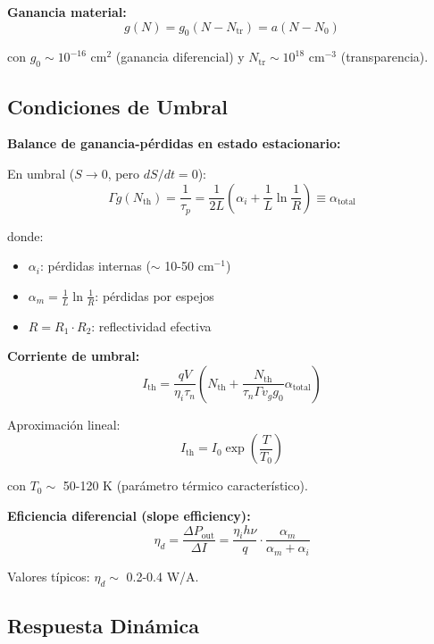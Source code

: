 \documentclass[11pt,a4paper]{article}
\begin{document}
\textbf{Ganancia material:}
\begin{equation}
    g(N) = g_0(N - N_{\text{tr}}) = a(N - N_0)
\end{equation}

con $g_0 \sim 10^{-16}$ cm$^2$ (ganancia diferencial) y $N_{\text{tr}} \sim 10^{18}$ cm$^{-3}$ (transparencia).

\subsection{Condiciones de Umbral}

\textbf{Balance de ganancia-pérdidas en estado estacionario:}

En umbral ($S \to 0$, pero $dS/dt = 0$):
\begin{equation}
    \Gamma g(N_{\text{th}}) = \frac{1}{\tau_p} = \frac{1}{2L}\left(\alpha_i + \frac{1}{L}\ln\frac{1}{R}\right) \equiv \alpha_{\text{total}}
\end{equation}

donde:
\begin{itemize}
    \item $\alpha_i$: pérdidas internas ($\sim$ 10-50 cm$^{-1}$)
    \item $\alpha_m = \frac{1}{L}\ln\frac{1}{R}$: pérdidas por espejos
    \item $R = R_1 \cdot R_2$: reflectividad efectiva
\end{itemize}

\textbf{Corriente de umbral:}
\begin{equation}
    I_{\text{th}} = \frac{qV}{\eta_i\tau_n}\left(N_{\text{th}} + \frac{N_{\text{th}}}{\tau_n \Gamma v_g g_0}\alpha_{\text{total}}\right)
\end{equation}

Aproximación lineal:
\begin{equation}
    I_{\text{th}} = I_0 \exp\left(\frac{T}{T_0}\right)
\end{equation}

con $T_0 \sim$ 50-120 K (parámetro térmico característico).

\textbf{Eficiencia diferencial (slope efficiency):}
\begin{equation}
    \eta_d = \frac{\Delta P_{\text{out}}}{\Delta I} = \frac{\eta_i h\nu}{q} \cdot \frac{\alpha_m}{\alpha_m + \alpha_i}
\end{equation}

Valores típicos: $\eta_d \sim$ 0.2-0.4 W/A.

\subsection{Respuesta Dinámica}
\end{document}
